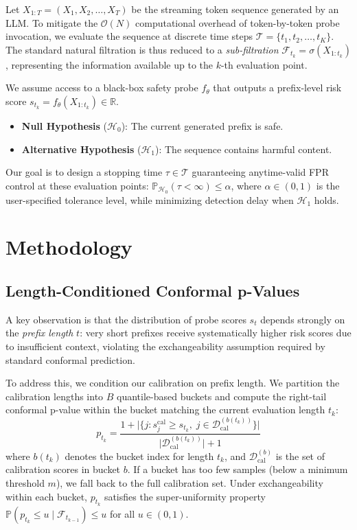 \documentclass[letterpaper,twocolumn,10pt]{article}
\newcommand{\Hcal}{\mathcal{H}}
\newcommand{\Fcal}{\mathcal{F}}
\newcommand{\Dcal}{\mathcal{D}}
\newcommand{\Tcal}{\mathcal{T}}
\begin{document}
Let $X_{1:T} = (X_1, X_2, \dots, X_T)$ be the streaming token sequence generated by an LLM.
To mitigate the $\mathcal{O}(N)$ computational overhead of token-by-token probe invocation, we evaluate the sequence at discrete time steps $\mathcal{T} = \{t_1, t_2, \dots, t_K\}$.
The standard natural filtration is thus reduced to a \emph{sub-filtration} $\Fcal_{t_k} = \sigma(X_{1:t_k})$, representing the information available up to the $k$-th evaluation point.

We assume access to a black-box safety probe $f_\theta$ that outputs a prefix-level risk score $s_{t_k} = f_\theta(X_{1:t_k}) \in \mathbb{R}$.
\begin{itemize}
  \item \textbf{Null Hypothesis} ($\Hcal_0$): The current generated prefix is safe.
  \item \textbf{Alternative Hypothesis} ($\Hcal_1$): The sequence contains harmful content.
\end{itemize}
Our goal is to design a stopping time $\tau \in \Tcal$ guaranteeing anytime-valid FPR control at these evaluation points:
$\mathbb{P}_{\Hcal_0}(\tau < \infty) \le \alpha$, where $\alpha \in (0,1)$ is the user-specified tolerance level, while minimizing detection delay when $\Hcal_1$ holds.

\section{Methodology}
\label{sec:method}

\subsection{Length-Conditioned Conformal p-Values}
\label{sec:pvalue}

A key observation is that the distribution of probe scores $s_t$ depends strongly on the \emph{prefix length} $t$: very short prefixes receive systematically higher risk scores due to insufficient context, violating the exchangeability assumption required by standard conformal prediction.

To address this, we condition our calibration on prefix length.
We partition the calibration lengths into $B$ quantile-based buckets and compute the right-tail conformal p-value within the bucket matching the current evaluation length $t_k$:
\begin{equation}
  p_{t_k} = \frac{1 + \bigl|\{j : s_j^{\mathrm{cal}} \ge s_{t_k},\; j \in \Dcal_{\mathrm{cal}}^{(b(t_k))}\}\bigr|}{\bigl|\Dcal_{\mathrm{cal}}^{(b(t_k))}\bigr| + 1}
  \label{eq:pvalue}
\end{equation}
where $b(t_k)$ denotes the bucket index for length $t_k$, and $\Dcal_{\mathrm{cal}}^{(b)}$ is the set of calibration scores in bucket $b$.
If a bucket has too few samples (below a minimum threshold $m$), we fall back to the full calibration set.
Under exchangeability within each bucket, $p_{t_k}$ satisfies the super-uniformity property $\mathbb{P}(p_{t_k} \le u \mid \Fcal_{t_{k-1}}) \le u$ for all $u \in (0,1)$.
\end{document}
